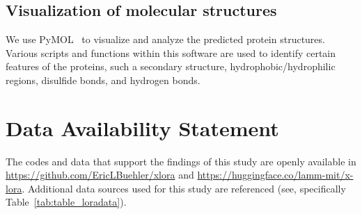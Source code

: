 \subsection{Visualization of molecular structures}

We use PyMOL~\cite{Schrodinger2015The1.8} to visualize and analyze the predicted protein structures. Various scripts and functions within this software are used to identify certain features of the proteins, such a secondary structure, hydrophobic/hydrophilic regions, disulfide bonds, and hydrogen bonds. 


\section*{Data Availability Statement}
The codes and data that support the findings of this study are openly available in \url{https://github.com/EricLBuehler/xlora} and \url{https://huggingface.co/lamm-mit/x-lora}. Additional data sources used for this study are referenced (see, specifically Table~\ref{tab:table_loradata}). 


